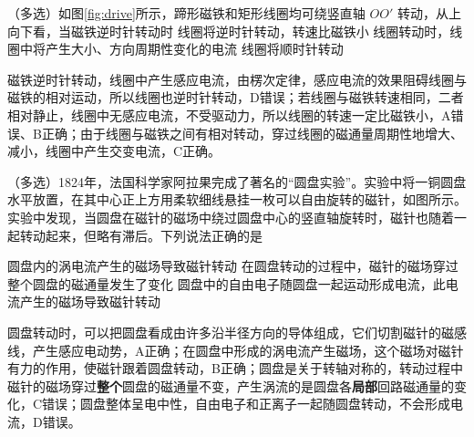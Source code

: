 \begin{liti}
（多选）如图\ref{fig:drive}所示，蹄形磁铁和矩形线圈均可绕竖直轴 $OO'$ 转动，从上向下看，当磁铁逆时针转动时
%
{线圈将逆时针转动，转速比磁铁小}%
{线圈转动时，线圈中将产生大小、方向周期性变化的电流}%
{线圈将顺时针转动}
\begin{jiexi}[2cm]
磁铁逆时针转动，线圈中产生感应电流，由楞次定律，感应电流的效果阻碍线圈与磁铁的相对运动，所以线圈也逆时针转动，D错误；若线圈与磁铁转速相同，二者相对静止，线圈中无感应电流，不受驱动力，所以线圈的转速一定比磁铁小，A错误、B正确；由于线圈与磁铁之间有相对转动，穿过线圈的磁通量周期性地增大、减小，线圈中产生交变电流，C正确。
\end{jiexi}
\end{liti}

\begin{liti}[2015·全国卷Ⅰ]
（多选）1824年，法国科学家阿拉果完成了著名的“圆盘实验”。实验中将一铜圆盘水平放置，在其中心正上方用柔软细线悬挂一枚可以自由旋转的磁针，如图所示。实验中发现，当圆盘在磁针的磁场中绕过圆盘中心的竖直轴旋转时，磁针也随着一起转动起来，但略有滞后。下列说法正确的是

\noindent\begin{minipage}[c]{0.7\linewidth}
%
{圆盘内的涡电流产生的磁场导致磁针转动}%
{在圆盘转动的过程中，磁针的磁场穿过整个圆盘的磁通量发生了变化}%
{圆盘中的自由电子随圆盘一起运动形成电流，此电流产生的磁场导致磁针转动}
\end{minipage}\hfill
\noindent\begin{minipage}[c]{0.27\linewidth}
\centering
{}
\end{minipage}
\begin{jiexi}[2.5cm]
圆盘转动时，可以把圆盘看成由许多沿半径方向的导体组成，它们切割磁针的磁感线，产生感应电动势，A正确；在圆盘中形成的涡电流产生磁场，这个磁场对磁针有力的作用，使磁针跟着圆盘转动，B正确；圆盘是关于转轴对称的，转动过程中磁针的磁场穿过\textbf{整个}圆盘的磁通量不变，产生涡流的是圆盘各\textbf{局部}回路磁通量的变化，C错误；圆盘整体呈电中性，自由电子和正离子一起随圆盘转动，不会形成电流，D错误。
\end{jiexi}
\end{liti}

